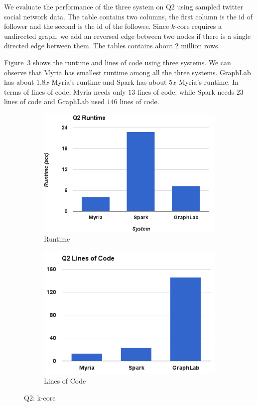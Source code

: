 We evaluate the performance of the three system on Q2 using sampled twitter 
social network data. The table contains two columns, the first column is the 
id of follower and the second is the id of the followee. Since $k$-core
requires a undirected graph, we add an reversed edge between two nodes 
if there is a single directed edge between them. The tables contains about 
2 million rows.

Figure~\ref{fig:q2} shows the runtime and lines of code using three systems. 
We can observe that Myria has smallest runtime among all the three systems. 
GraphLab has about $1.8x$ Myria's runtime and Spark has about $5x$ Myria's 
runtime. In terms of lines of code, Myria needs only $13$ lines of code, while
Spark needs $23$ lines of code and GraphLab used $146$ lines of code. 

\begin{figure}[t]
    \centering
    \begin{subfigure}{0.7\linewidth}
        \includegraphics[width=\textwidth]{images/q2_runtime.png}
        \caption{Runtime}
        \label{fig:q2_runtime}
    \end{subfigure}
    \begin{subfigure}{0.7\linewidth}
        \includegraphics[width=\textwidth]{images/q2_loc.png}
        \caption{Lines of Code}
        \label{fig:q2_loc}
    \end{subfigure}
\caption{Q2: k-core}
\label{fig:q2}
\end{figure}

